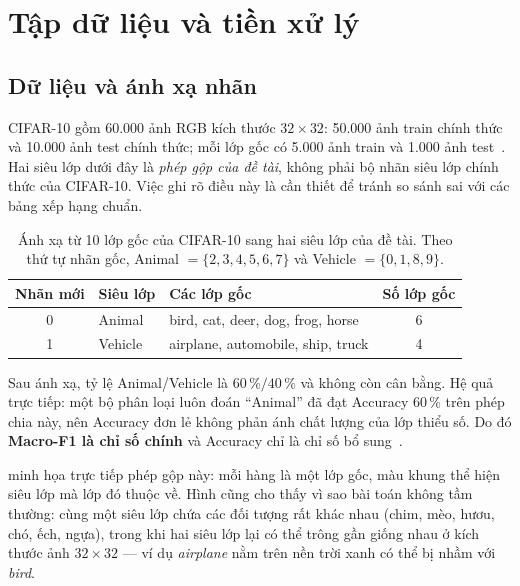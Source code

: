\section{Tập dữ liệu và tiền xử lý}
\label{sec:data}

\subsection{Dữ liệu và ánh xạ nhãn}
\label{sec:data-mapping}

CIFAR-10 gồm 60.000 ảnh RGB kích thước $32 \times 32$: 50.000 ảnh train chính thức và 10.000
ảnh test chính thức; mỗi lớp gốc có 5.000 ảnh train và 1.000 ảnh test~\cite{krizhevsky2009cifar}.
Hai siêu lớp dưới đây là \emph{phép gộp của đề tài}, không phải bộ nhãn siêu lớp chính thức
của CIFAR-10. Việc ghi rõ điều này là cần thiết để tránh so sánh sai với các bảng xếp hạng
chuẩn.

\begin{table}[htbp]
  \centering
  \small
  \begin{tabular}{@{}c l l c@{}}
    \toprule
    Nhãn mới & Siêu lớp & Các lớp gốc & Số lớp gốc \\
    \midrule
    0 & Animal  & bird, cat, deer, dog, frog, horse & 6 \\
    1 & Vehicle & airplane, automobile, ship, truck & 4 \\
    \bottomrule
  \end{tabular}
  \caption{Ánh xạ từ 10 lớp gốc của CIFAR-10 sang hai siêu lớp của đề tài. Theo thứ tự nhãn gốc,
  Animal $= \{2,3,4,5,6,7\}$ và Vehicle $= \{0,1,8,9\}$.}
  \label{tab:label-map}
\end{table}

Sau ánh xạ, tỷ lệ Animal/Vehicle là $60\,\%/40\,\%$ và không còn cân bằng. Hệ quả trực tiếp:
một bộ phân loại luôn đoán \enquote{Animal} đã đạt Accuracy $60\,\%$ trên phép chia này, nên
Accuracy đơn lẻ không phản ánh chất lượng của lớp thiểu số. Do đó \textbf{Macro-F1 là chỉ số
chính} và Accuracy chỉ là chỉ số bổ sung~\cite{guo2017calibration}.

 minh họa trực tiếp phép gộp này: mỗi hàng là một lớp gốc, màu
khung thể hiện siêu lớp mà lớp đó thuộc về. Hình cũng cho thấy vì sao bài toán không tầm
thường: cùng một siêu lớp chứa các đối tượng rất khác nhau (chim, mèo, hươu, chó, ếch, ngựa),
trong khi hai siêu lớp lại có thể trông gần giống nhau ở kích thước ảnh $32 \times 32$ — ví dụ
\emph{airplane} nằm trên nền trời xanh có thể bị nhầm với \emph{bird}.

